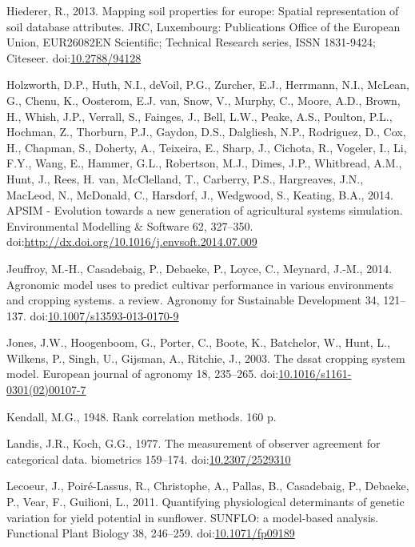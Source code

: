 \documentclass[a4paper]{article}
\begin{document}
\hypertarget{ref-Hiederer2013}{}
Hiederer, R., 2013. Mapping soil properties for europe: Spatial
representation of soil database attributes. JRC, Luxembourg:
Publications Office of the European Union, EUR26082EN Scientific;
Technical Research series, ISSN 1831-9424; Citeseer.
doi:\href{https://doi.org/10.2788/94128}{10.2788/94128}

\hypertarget{ref-Holzworth2014}{}
Holzworth, D.P., Huth, N.I., deVoil, P.G., Zurcher, E.J., Herrmann,
N.I., McLean, G., Chenu, K., Oosterom, E.J. van, Snow, V., Murphy, C.,
Moore, A.D., Brown, H., Whish, J.P., Verrall, S., Fainges, J., Bell,
L.W., Peake, A.S., Poulton, P.L., Hochman, Z., Thorburn, P.J., Gaydon,
D.S., Dalgliesh, N.P., Rodriguez, D., Cox, H., Chapman, S., Doherty, A.,
Teixeira, E., Sharp, J., Cichota, R., Vogeler, I., Li, F.Y., Wang, E.,
Hammer, G.L., Robertson, M.J., Dimes, J.P., Whitbread, A.M., Hunt, J.,
Rees, H. van, McClelland, T., Carberry, P.S., Hargreaves, J.N., MacLeod,
N., McDonald, C., Harsdorf, J., Wedgwood, S., Keating, B.A., 2014. APSIM
- Evolution towards a new generation of agricultural systems simulation.
Environmental Modelling \& Software 62, 327--350.
doi:\href{https://doi.org/http://dx.doi.org/10.1016/j.envsoft.2014.07.009}{http://dx.doi.org/10.1016/j.envsoft.2014.07.009}

\hypertarget{ref-Jeuffroy2014}{}
Jeuffroy, M.-H., Casadebaig, P., Debaeke, P., Loyce, C., Meynard, J.-M.,
2014. Agronomic model uses to predict cultivar performance in various
environments and cropping systems. a review. Agronomy for Sustainable
Development 34, 121--137.
doi:\href{https://doi.org/10.1007/s13593-013-0170-9}{10.1007/s13593-013-0170-9}

\hypertarget{ref-Jones2003}{}
Jones, J.W., Hoogenboom, G., Porter, C., Boote, K., Batchelor, W., Hunt,
L., Wilkens, P., Singh, U., Gijsman, A., Ritchie, J., 2003. The dssat
cropping system model. European journal of agronomy 18, 235--265.
doi:\href{https://doi.org/10.1016/s1161-0301(02)00107-7}{10.1016/s1161-0301(02)00107-7}

\hypertarget{ref-Kendall1948}{}
Kendall, M.G., 1948. Rank correlation methods. 160 p.

\hypertarget{ref-Landis1977}{}
Landis, J.R., Koch, G.G., 1977. The measurement of observer agreement
for categorical data. biometrics 159--174.
doi:\href{https://doi.org/10.2307/2529310}{10.2307/2529310}

\hypertarget{ref-Lecoeur2011}{}
Lecoeur, J., Poiré-Lassus, R., Christophe, A., Pallas, B., Casadebaig,
P., Debaeke, P., Vear, F., Guilioni, L., 2011. Quantifying physiological
determinants of genetic variation for yield potential in sunflower.
SUNFLO: a model-based analysis. Functional Plant Biology 38, 246--259.
doi:\href{https://doi.org/10.1071/fp09189}{10.1071/fp09189}
\end{document}
